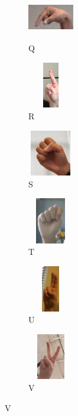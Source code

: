 \begin{figure}[H]
  \begin{subfigure}{0.1\textwidth}
    \includegraphics[width=2cm, height=2cm, keepaspectratio=false]{images/7-anexe/q_ex1.jpg}
    \caption{Q}
  \end{subfigure}\hspace{1cm}
  \begin{subfigure}{0.1\textwidth}
    \includegraphics[width=2cm, height=2cm, keepaspectratio=false]{images/7-anexe/r_ex1.jpg}
    \caption{R}
  \end{subfigure}\hspace{1cm}
  \begin{subfigure}{0.1\textwidth}
    \includegraphics[width=2cm, height=2cm, keepaspectratio=false]{images/7-anexe/s_ex1.JPG}
    \caption{S}
  \end{subfigure}\hspace{1cm}

    \begin{subfigure}{0.1\textwidth}
    \includegraphics[width=2cm, height=2cm, keepaspectratio=false]{images/7-anexe/t_ex1.jpg}
    \caption{T}
  \end{subfigure}\hspace{1cm}
  \begin{subfigure}{0.1\textwidth}
    \includegraphics[width=2cm, height=2cm, keepaspectratio=false]{images/7-anexe/u_ex1.jpg}
    \caption{U}
  \end{subfigure}\hspace{1cm}
  \begin{subfigure}{0.1\textwidth}
    \includegraphics[width=2cm, height=2cm, keepaspectratio=false]{images/7-anexe/v_ex1.jpg}
    \caption{V}
  \end{subfigure}\hspace{1cm}


\end{figure}
